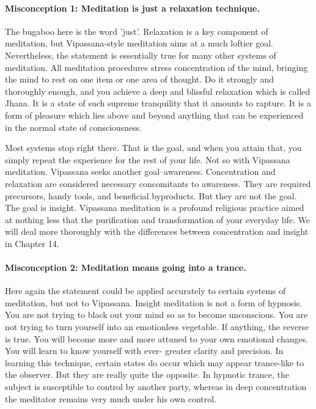 \paragraph*{Misconception 1: Meditation is just a relaxation technique.}

The bugaboo here is
the word 'just'. Relaxation is a key component of meditation, but
Vipassana-style meditation aims at a much loftier goal. Nevertheless, the
statement is essentially true for many other systems of meditation. All
meditation procedures stress concentration of the mind, bringing the mind to
rest on one item or one area of thought. Do it strongly and thoroughly enough,
and you achieve a deep and blissful relaxation which is called Jhana. It is a
state of such supreme tranquility that it amounts to rapture. It is a form of
pleasure which lies above and beyond anything that can be experienced in the
normal state of consciousness.

Most systems stop right there. That is the goal, and when you attain that, you
simply repeat the experience for the rest of your life. Not so with Vipassana
meditation. Vipassana seeks another goal--awareness. Concentration and
relaxation are considered necessary concomitants to awareness. They are required
precursors, handy tools, and beneficial byproducts. But they are not the goal.
The goal is insight. Vipassana meditation is a profound religious practice aimed
at nothing less that the purification and transformation of your everyday life.
We will deal more thoroughly with the differences between concentration and
insight in Chapter 14.

\paragraph*{Misconception 2: Meditation means going into a trance.}

Here again the statement could be applied accurately to certain systems of meditation, but not to
Vipassana. Insight meditation is not a form of hypnosis. You are not trying to
black out your mind so as to become unconscious. You are not trying to turn
yourself into an emotionless vegetable. If anything, the reverse is true. You
will become more and more attuned to your own emotional changes. You will learn
to know yourself with ever- greater clarity and precision. In learning this
technique, certain states do occur which may appear trance-like to the observer.
But they are really quite the opposite. In hypnotic trance, the subject is
susceptible to control by another party, whereas in deep concentration the
meditator remains very much under his own control.

